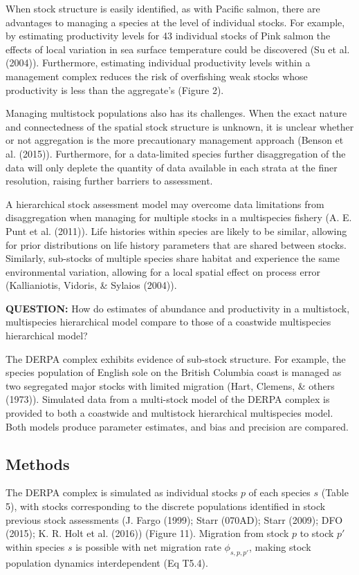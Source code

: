 \documentclass[12pt,]{scrartcl}
\begin{document}
When stock structure is easily identified, as with Pacific salmon, there
are advantages to managing a species at the level of individual stocks.
For example, by estimating productivity levels for 43 individual stocks
of Pink salmon the effects of local variation in sea surface temperature
could be discovered (Su et al. (2004)). Furthermore, estimating
individual productivity levels within a management complex reduces the
risk of overfishing weak stocks whose productivity is less than the
aggregate's (Figure 2).

Managing multistock populations also has its challenges. When the exact
nature and connectedness of the spatial stock structure is unknown, it
is unclear whether or not aggregation is the more precautionary
management approach (Benson et al. (2015)). Furthermore, for a
data-limited species further disaggregation of the data will only
deplete the quantity of data available in each strata at the finer
resolution, raising further barriers to assessment.

A hierarchical stock assessment model may overcome data limitations from
disaggregation when managing for multiple stocks in a multispecies
fishery (A. E. Punt et al. (2011)). Life histories within species are
likely to be similar, allowing for prior distributions on life history
parameters that are shared between stocks. Similarly, sub-stocks of
multiple species share habitat and experience the same environmental
variation, allowing for a local spatial effect on process error
(Kallianiotis, Vidoris, \& Sylaios (2004)).

\textbf{QUESTION:} How do estimates of abundance and productivity in a
multistock, multispecies hierarchical model compare to those of a
coastwide multispecies hierarchical model?

The DERPA complex exhibits evidence of sub-stock structure. For example,
the species population of English sole on the British Columbia coast is
managed as two segregated major stocks with limited migration (Hart,
Clemens, \& others (1973)). Simulated data from a multi-stock model of
the DERPA complex is provided to both a coastwide and multistock
hierarchical multispecies model. Both models produce parameter
estimates, and bias and precision are compared.

\subsection{Methods}\label{methods-1}

The DERPA complex is simulated as individual stocks \(p\) of each
species \(s\) (Table 5), with stocks corresponding to the discrete
populations identified in stock previous stock assessments (J. Fargo
(1999); Starr (070AD); Starr (2009); DFO (2015); K. R. Holt et al.
(2016)) (Figure 11). Migration from stock \(p\) to stock \(p'\) within
species \(s\) is possible with net migration rate \(\phi_{s,p,p'}\),
making stock population dynamics interdependent (Eq T5.4).
\end{document}
